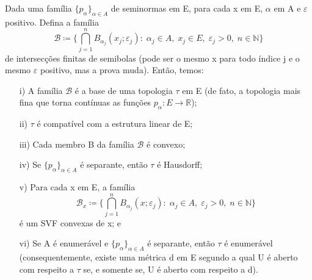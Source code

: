 \documentclass[../distribution_theory_notes.tex]{subfiles}
\begin{document}
\begin{prop*}
	Dada uma família \(\{p_{\alpha }\}_{\alpha \in A}\) de seminormas em E, para cada x em E, \(\alpha \) em A e \(\varepsilon \) positivo. Defina a família
	\[
		\mathcal{B}\coloneqq \biggl\{\bigcap_{j=1}^{n}B_{\alpha_{j}}(x_{j}; \varepsilon_{j}):\;\alpha_{j}\in A,\; x_{j}\in E,\; \varepsilon_{j}>0,\; n\in \mathbb{N}\biggr\}
	\]
	de intersecções finitas de semibolas (pode ser o mesmo x para todo índice j e o mesmo \(\varepsilon \) positivo, mas a prova muda). Então, temos:
	\begin{itemize}
		\item[i)] A família \(\mathcal{B}\) é a base de uma topologia \(\tau \) em E (de fato, a topologia mais fina que torna contínuas as funções \(p_{\alpha }:E\rightarrow \mathbb{R}\));
		\item[ii)] \(\tau \) é compatível com a estrutura linear de E;
		\item[iii)] Cada membro B da família \(\mathcal{B}\) é convexo;
		\item[iv)] Se \(\{p_{\alpha }\}_{\alpha \in A}\) é separante, então \(\tau \) é Hausdorff;
		\item[v)] Para cada x em E, a família
		      \[
			      \mathcal{B}_{x}\coloneqq \biggl\{\bigcap_{j=1}^{n}B_{\alpha_{j}}(x; \varepsilon_{j}):\; \alpha_{j}\in A,\; \varepsilon_{j}>0,\; n\in \mathbb{N}\biggr\}
		      \]
		      é um SVF convexas de x; e
		\item[vi)] Se A é enumerável e \(\{p_{\alpha }\}_{\alpha \in A}\) é separante, então \(\tau \) é enumerável (consequentemente, existe uma métrica d em E segundo a qual U é aberto com respeito a \(\tau \) se, e somente se, U é aberto com respeito a d).
	\end{itemize}
\end{prop*}
\end{document}
